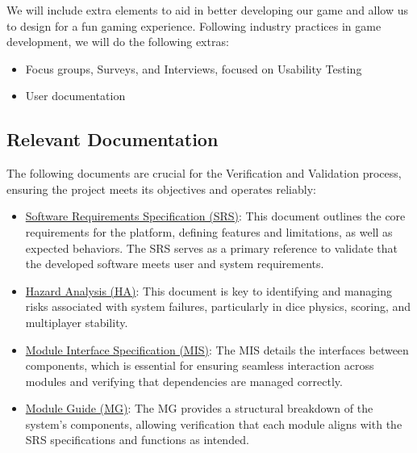 \documentclass[12pt, titlepage]{article}
\begin{document}
We will include extra elements to aid in better developing our game and allow us to design for a fun gaming experience. Following industry practices in game development, we will do the following extras:
\begin{itemize}
	\item Focus groups, Surveys, and Interviews, focused on Usability Testing
	\item User documentation
\end{itemize}

\subsection{Relevant Documentation}

\iffalse
\wss{Reference relevant documentation.  This will definitely include your SRS
  and your other project documents (design documents, like MG, MIS, etc).  You
  can include these even before they are written, since by the time the project
  is done, they will be written.  You can create BibTeX entries for your
  documents and within those entries include a hyperlink to the documents.}
\citet{SRS}
\wss{Don't just list the other documents.  You should explain why they are relevant and 
how they relate to your VnV efforts.}
\fi

The following documents are crucial for the Verification and Validation process, ensuring the project meets its objectives and operates reliably:

\begin{itemize}
	\item \href{https://github.com/John-Popovici/duel-of-the-eights/blob/main/docs/SRS/SRS.pdf}{Software Requirements Specification (SRS)}: This document outlines the core requirements for the platform, defining features and limitations, as well as expected behaviors. The SRS serves as a primary reference to validate that the developed software meets user and system requirements.
	\item \href{https://github.com/John-Popovici/duel-of-the-eights/blob/main/docs/HazardAnalysis/HazardAnalysis.pdf}{Hazard Analysis (HA)}: This document is key to identifying and managing risks associated with system failures, particularly in dice physics, scoring, and multiplayer stability.
	\item \href{https://github.com/John-Popovici/duel-of-the-eights/blob/main/docs/Design/SoftDetailedDes/MIS.pdf}{Module Interface Specification (MIS)}: The MIS details the interfaces between components, which is essential for ensuring seamless interaction across modules and verifying that dependencies are managed correctly.
	\item \href{https://github.com/John-Popovici/duel-of-the-eights/blob/main/docs/Design/SoftArchitecture/MG.pdf}{Module Guide (MG)}: The MG provides a structural breakdown of the system's components, allowing verification that each module aligns with the SRS specifications and functions as intended.
\end{itemize}
\end{document}
